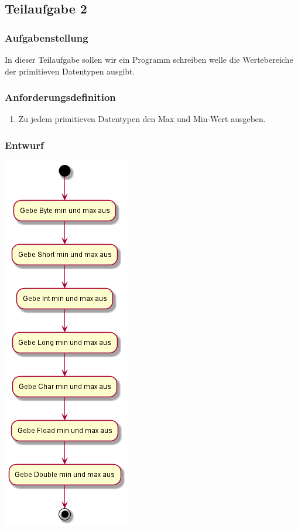 \subsection{Teilaufgabe 2}
\subsubsection{Aufgabenstellung}
In dieser Teilaufgabe sollen wir ein Programm schreiben welle die Wertebereiche der primitieven
Datentypen ausgibt.

\subsubsection{Anforderungsdefinition}
\begin{enumerate}
	\item Zu jedem primitieven Datentypen den Max und Min-Wert ausgeben.
\end{enumerate}

\subsubsection{Entwurf}
\includegraphics[scale=0.75]{uml/uml_c3_p1.png}

